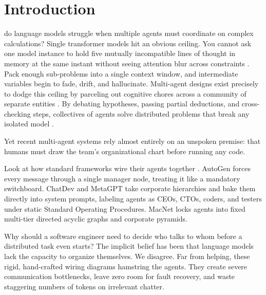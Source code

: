 \documentclass{ieeeaccess}
\begin{document}
\titlepgskip=-15pt

\maketitle


\section{Introduction}
\label{sec:introduction}

 do language models struggle when multiple agents must coordinate on complex calculations? Single transformer models hit an obvious ceiling. You cannot ask one model instance to hold five mutually incompatible lines of thought in memory at the same instant without seeing attention blur across constraints \cite{vaswani2017attention, wang2023selfconsistency, wei2022emergent}. Pack enough sub-problems into a single context window, and intermediate variables begin to fade, drift, and hallucinate. Multi-agent designs exist precisely to dodge this ceiling by parceling out cognitive chores across a community of separate entities \cite{park2023generative, xi2023rise, wu2024autogen}. By debating hypotheses, passing partial deductions, and cross-checking steps, collectives of agents solve distributed problems that break any isolated model \cite{du2023debate, qian2024chatdev, hong2024metagpt}.

Yet recent multi-agent systems rely almost entirely on an unspoken premise: that humans must draw the team's organizational chart before running any code.

Look at how standard frameworks wire their agents together \cite{boiko2023autonomous, romera2024mathematical}. AutoGen \cite{wu2024autogen} forces every message through a single manager node, treating it like a mandatory switchboard. ChatDev \cite{qian2024chatdev} and MetaGPT \cite{hong2024metagpt} take corporate hierarchies and bake them directly into system prompts, labeling agents as CEOs, CTOs, coders, and testers under static Standard Operating Procedures. MacNet \cite{wang2025macnet} locks agents into fixed multi-tier directed acyclic graphs and corporate pyramids.

Why should a software engineer need to decide who talks to whom before a distributed task even starts? The implicit belief has been that language models lack the capacity to organize themselves. We disagree. Far from helping, these rigid, hand-crafted wiring diagrams hamstring the agents. They create severe communication bottlenecks, leave zero room for fault recovery, and waste staggering numbers of tokens on irrelevant chatter.
\end{document}
